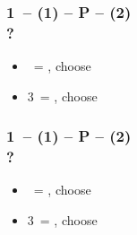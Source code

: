 \documentclass[12pt, a4paper]{article}
\begin{document}
\subsubsection*{1\diams\ -- (1\spades) -- P -- (2\spades) \\ ?}
\begin{itemize}
    \item \dbl\ = \diams\hearts, choose
    \item 3\clubs\ = \clubs\diams, choose
\end{itemize}

\subsubsection*{1\diams\ -- (1\hearts) -- P -- (2\hearts) \\ ?}
\begin{itemize}
    \item \dbl\ = \diams\spades, choose
    \item 3\clubs\ = \clubs\diams, choose
\end{itemize}


\end{document}
